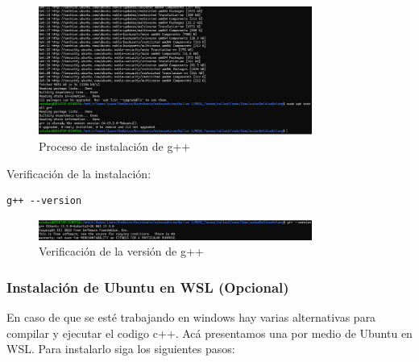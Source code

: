 \documentclass{article}
\begin{document}
\begin{figure}[H]
    \centering
    \includegraphics[width=0.8\textwidth]{images/manualUsuarioErlangBC_1.png}
    \caption{Proceso de instalación de g++}
    \label{fig:instalacion}
\end{figure}

Verificación de la instalación:
\begin{verbatim}
g++ --version
\end{verbatim}

\begin{figure}[H]
    \centering
    \includegraphics[width=0.8\textwidth]{images/manualUsuarioErlangBC_2.png}
    \caption{Verificación de la versión de g++}
    \label{fig:version}
\end{figure}

\subsubsection{Instalación de Ubuntu en WSL (Opcional)}
En caso de que se esté trabajando en windows hay varias alternativas para compilar y ejecutar el codigo c++. Acá presentamos una por medio de Ubuntu en WSL. Para instalarlo siga los siguientes pasos:
\end{document}
